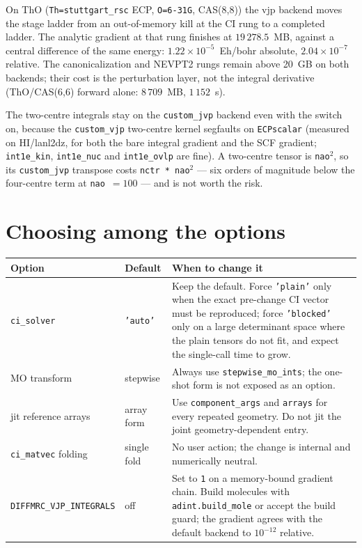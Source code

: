 On ThO (\texttt{Th=stuttgart\_rsc} ECP, \texttt{O=6-31G},
CAS(8,8)) the vjp backend moves the stage ladder from an
out-of-memory kill at the CI rung to a completed ladder.  The
analytic gradient at that rung finishes at $19\,278.5$~MB, against a
central difference of the same energy: $1.22\times10^{-5}$~Eh/bohr
absolute, $2.04\times10^{-7}$ relative.  The canonicalization and
NEVPT2 rungs remain above 20~GB on both backends; their cost is the
perturbation layer, not the integral derivative (ThO/CAS(6,6)
forward alone: $8\,709$~MB, $1\,152$~s).

The two-centre integrals stay on the \texttt{custom\_jvp} backend even
with the switch on, because the \texttt{custom\_vjp} two-centre kernel
segfaults on \texttt{ECPscalar} (measured on HI/lanl2dz, for both the
bare integral gradient and the SCF gradient; \texttt{int1e\_kin},
\texttt{int1e\_nuc} and \texttt{int1e\_ovlp} are fine).  A two-centre
tensor is \texttt{nao}$^2$, so its \texttt{custom\_jvp} transpose costs
\texttt{nctr * nao}$^2$ --- six orders of magnitude below the
four-centre term at \texttt{nao}~$=100$ --- and is not worth the risk.

\section{Choosing among the options}

\begin{center}
\begin{tabular}{p{}p{}p{}}
\toprule
Option & Default & When to change it \\
\midrule
\texttt{ci\_solver} & \texttt{'auto'} &
Keep the default.  Force \texttt{'plain'} only when the exact
pre-change CI vector must be reproduced; force \texttt{'blocked'} only
on a large determinant space where the plain tensors do not fit, and
expect the single-call time to grow. \\
MO transform & stepwise &
Always use \texttt{stepwise\_mo\_ints}; the one-shot form is not
exposed as an option. \\
jit reference arrays & array form &
Use \texttt{component\_args} and \texttt{arrays} for every repeated
geometry.  Do not jit the joint geometry-dependent entry. \\
\texttt{ci\_matvec} folding & single fold &
No user action; the change is internal and numerically neutral. \\
\texttt{DIFFMRC\_VJP\_INTEGRALS} & off &
Set to \texttt{1} on a memory-bound gradient chain.  Build molecules
with \texttt{adint.build\_mole} or accept the build guard; the gradient
agrees with the default backend to $10^{-12}$ relative. \\
\bottomrule
\end{tabular}
\end{center}

